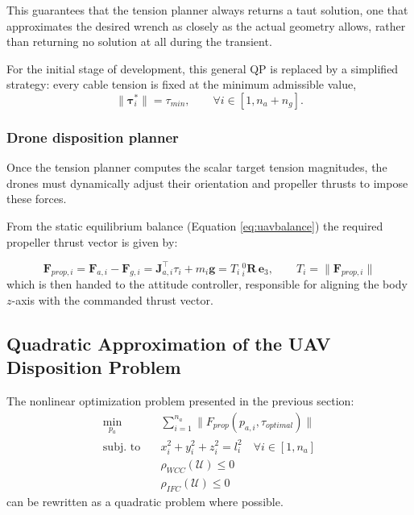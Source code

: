 This guarantees that the tension planner always returns a taut solution, one that approximates the desired wrench as closely as the actual geometry allows, rather than returning no solution at all during the transient.

For the initial stage of development, this general QP is replaced by a simplified strategy: every cable tension is fixed at the minimum admissible value,
\begin{equation}
    \lVert \mathbf{\tau}_i^* \rVert = \tau_{min}, \qquad \forall i \in [1, n_a + n_g].
    \label{eq:tau-min-simplification}
\end{equation}



\subsubsection{Drone disposition planner}
Once the tension planner computes the scalar target tension magnitudes, the drones must dynamically adjust their orientation and propeller thrusts to impose these forces. 

From the static equilibrium balance (Equation \ref{eq:uavbalance}) the required propeller thrust vector is given by:

\begin{equation}
    \mathbf{F}_{prop,i} = \mathbf{F}_{a,i} - \mathbf{F}_{g,i} = \mathbf{J}_{a,i}^\top \tau_i + m_i \mathbf{g} = T_i \,^0_i\mathbf{R}\,\mathbf{e}_3, \qquad T_i = \lVert \mathbf{F}_{prop,i} \rVert
    \label{eq:drone-disposition}
\end{equation}
which is then handed to the attitude controller, responsible for aligning the body $z$-axis with the commanded thrust vector.

\subsection{Quadratic Approximation of the UAV Disposition Problem}
\label{sec:NLPtoQP}
The nonlinear optimization problem presented in the previous section:
$$
    \begin{aligned}
        \min_{p_a} \quad & \sum_{i=1}^{n_a}\|F_{prop}(p_{a, i}, \tau_{optimal})\|\\
        \text{subj. to} \quad 
        & x_i^2 + y_i^2 + z_i^2 = l_i^2 \quad \forall i \in [1, n_a]\\
        & \rho_{WCC}(\mathcal{U})\le 0\\
        & \rho_{IFC}(\mathcal{U})\le 0
    \end{aligned}
$$
can be rewritten as a quadratic problem where possible.

